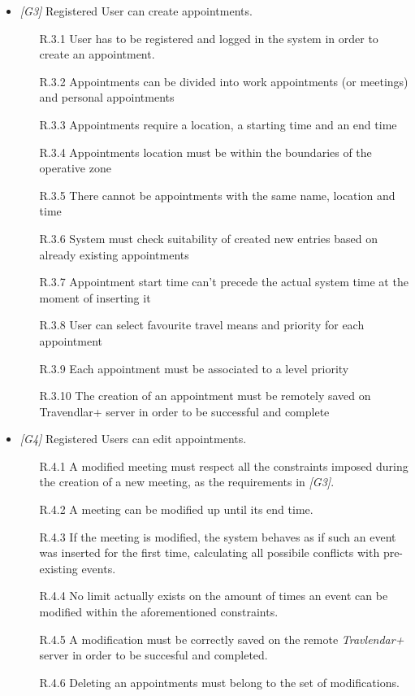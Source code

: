 \begin{itemize}
	
	\item \textit{[G3]} Registered User can create appointments.
		\begin{itemize}
			\item [R.3.1] User has to be registered and logged in the system in order to create an
appointment.
			\item [R.3.2] Appointments can be divided into work appointments (or meetings) and personal appointments
			\item [R.3.3] Appointments require a location, a starting time and an end time
			\item [R.3.4] Appointments location must be within the boundaries of the operative zone
			\item [R.3.5] There cannot be appointments with the same name, location and time
			\item [R.3.6] System must check suitability of created new entries based on already existing appointments
			\item [R.3.7] Appointment start time can't precede the actual system time at the moment of inserting it                                 							
			\item [R.3.8] User can select favourite travel means and priority for each appointment
			\item [R.3.9] Each appointment must be associated to a level priority
			\item [R.3.10] The creation of an appointment must be remotely saved on Travendlar+ server in order to be successful and complete
		\end{itemize}


	\item \textit{[G4]} Registered Users can edit appointments.
		 \begin{itemize}
		 	\item  [R.4.1] A modified meeting must respect all the constraints imposed during the creation of a new meeting, as the requirements in \textit{[G3]}.
		 	\item [R.4.2] A meeting can be modified up until its end time.
		 	\item [R.4.3] If the meeting is modified, the system behaves as if such an event was inserted for the first time, calculating all possibile conflicts with pre-existing events.
		 	\item [R.4.4] No limit actually exists on the amount of times an event can be modified within the aforementioned constraints.
		 	\item [R.4.5] A modification must be correctly saved on the remote \textit{Travlendar+} server in order to be succesful and completed.
		 	\item [R.4.6] Deleting an appointments must belong to the set of modifications.
		 \end{itemize}



\end{itemize}
